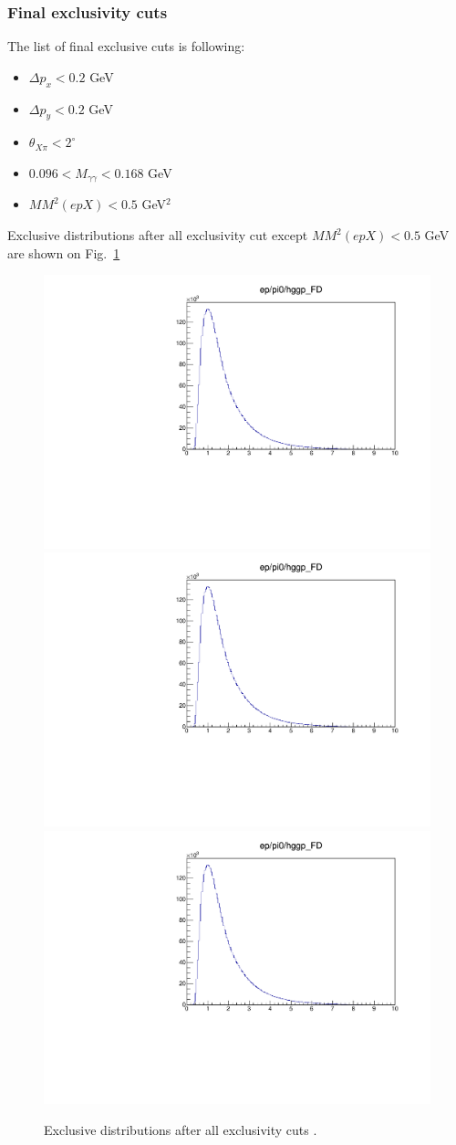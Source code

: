     \clearpage
    
    \subsubsection{Final exclusivity cuts}
    
    The list of final exclusive cuts is following:
    \begin{itemize}
    	\item $\Delta p_x<0.2$ GeV
    	\item $\Delta p_y<0.2$ GeV
    	\item $\theta_{X\pi}<2^\circ$
    	\item $0.096<M_{\gamma\gamma}<0.168$ GeV
    	\item $MM^2(epX)<0.5$ GeV$^2$
    \end{itemize}
    
    Exclusive distributions after all exclusivity cut except $MM^2(epX)<0.5$ GeV are shown on Fig.~\ref{fig:finalexclusive}
    
    \begin{figure}[hbt]
    	\centering
    	
    	\includegraphics[page=82,width=0.32\linewidth]{Chapters/Ch4-BaseAnalysis/1_Event_Selection_Cuts/figures/eppi0.exclusive.pdf}
    	\includegraphics[page=83,width=0.32\linewidth]{Chapters/Ch4-BaseAnalysis/1_Event_Selection_Cuts/figures/eppi0.exclusive.pdf}
    	\includegraphics[page=84,width=0.32\linewidth]{Chapters/Ch4-BaseAnalysis/1_Event_Selection_Cuts/figures/eppi0.exclusive.pdf}
    	\caption{Exclusive distributions after all exclusivity cuts .}
    	\label{fig:finalexclusive}
    \end{figure}
    
